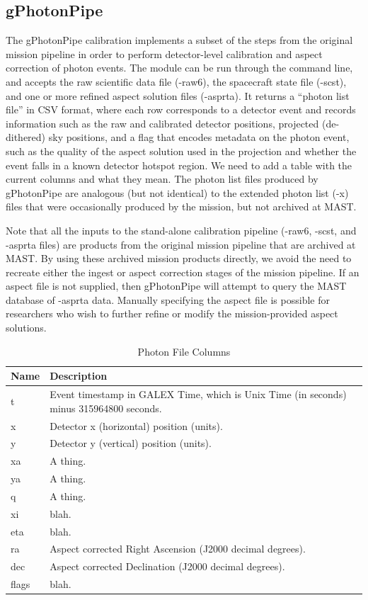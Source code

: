 \documentclass[5p]{elsarticle}
\begin{document}
\subsection{gPhotonPipe}
The gPhotonPipe calibration implements a subset of the steps from the original mission pipeline in order to perform detector-level calibration and aspect correction of photon events. The module can be run through the command line, and accepts the raw scientific data file (-raw6), the spacecraft state file (-scst), and one or more refined aspect solution files (-asprta). It returns a ``photon list file'' in CSV format, where each row corresponds to a detector event and records information such as the raw and calibrated detector positions, projected (de-dithered) sky positions, and a flag that encodes metadata on the photon event, such as the quality of the aspect solution used in the projection and whether the event falls in a known detector hotspot region. {\color{red}We need to add a table with the current columns and what they mean.} The photon list files produced by gPhotonPipe are analogous (but not identical) to the extended photon list (-x) files that were occasionally produced by the mission, but not archived at MAST.

Note that all the inputs to the stand-alone calibration pipeline (-raw6, -scst, and -asprta files) are products from the original mission pipeline that are archived at MAST.  By using these archived mission products directly, we avoid the need to recreate either the ingest or aspect correction stages of the mission pipeline. If an aspect file is not supplied, then gPhotonPipe will attempt to query the MAST database of -asprta data.  Manually specifying the aspect file is possible for researchers who wish to further refine or modify the mission-provided aspect solutions.

\begin{table}
\begin{tabular}{|p{2cm}|p{6cm}|}
\hline
	{\bf Name} & {\bf Description}\\\hline
	t & Event timestamp in GALEX Time, which is Unix Time (in seconds) minus 315964800 seconds.\\\hline
	x & Detector x (horizontal) position (units).\\\hline
	y & Detector y (vertical) position (units).\\\hline
	xa & A thing.\\\hline
	ya & A thing.\\\hline
	q & A thing.\\\hline
	xi & blah.\\\hline
	eta & blah.\\\hline
	ra & Aspect corrected Right Ascension (J2000 decimal degrees).\\\hline
	dec & Aspect corrected Declination (J2000 decimal degrees).\\\hline
	flags & blah.\\
\hline
\end{tabular}
\caption{Photon File Columns}
\label{moduledesc}
\end{table}
\end{document}
